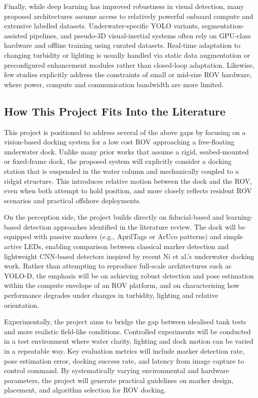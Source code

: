 Finally, while deep learning has improved robustness in visual detection, many proposed architectures assume access to relatively powerful onboard compute and extensive labelled datasets. Underwater-specific YOLO variants, segmentation-assisted pipelines, and pseudo-3D visual-inertial systems often rely on GPU-class hardware and offline training using curated datasets. Real-time adaptation to changing turbidity or lighting is usually handled via static data augmentation or preconfigured enhancement modules rather than closed-loop adaptation. Likewise, few studies explicitly address the constraints of small or mid-size ROV hardware, where power, compute and communication bandwidth are more limited.

\subsection{How This Project Fits Into the Literature}

This project is positioned to address several of the above gaps by focusing on a vision-based docking system for a low cost ROV approaching a free-floating underwater dock. Unlike many prior works that assume a rigid, seabed-mounted or fixed-frame dock, the proposed system will explicitly consider a docking station that is suspended in the water column and mechanically coupled to a ridgid structure. This introduces relative motion between the dock and the ROV, even when both attempt to hold position, and more closely reflects resident ROV scenarios and practical offshore deployments.

On the perception side, the project builds directly on fiducial-based and learning-based detection approaches identified in the literature review. The dock will be equipped with passive markers (e.g., AprilTags or ArUco patterns) and simple active LEDs, enabling comparison between classical marker detection and lightweight CNN-based detectors inspired by recent Ni et al.'s underwater docking work. Rather than attempting to reproduce full-scale architectures such as YOLO-D, the emphasis will be on achieving robust detection and pose estimation within the compute envelope of an ROV platform, and on characterising how performance degrades under changes in turbidity, lighting and relative orientation.

Experimentally, the project aims to bridge the gap between idealised tank tests and more realistic field-like conditions. Controlled experiments will be conducted in a test environment where water clarity, lighting and dock motion can be varied in a repeatable way. Key evaluation metrics will include marker detection rate, pose estimation error, docking success rate, and latency from image capture to control command. By systematically varying environmental and hardware parameters, the project will generate practical guidelines on marker design, placement, and algorithm selection for ROV docking.

